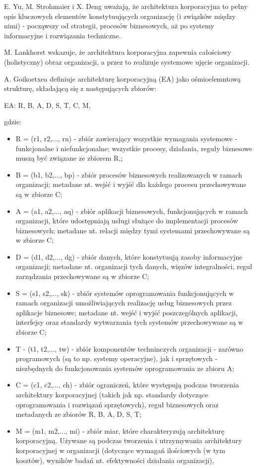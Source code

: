 E. Yu, M. Strohmaier i X. Deng uważają, że architektura korporacyjna to pełny opis kluczowych elementów konstytuujących organizację (i związków między nimi) - począwszy od strategii, procesów biznesowych, aż po systemy informacyjne i rozwiązania techniczne.

M. Lankhorst wskazuje, że architektura korporacyjna zapewnia całościowy (holistyczny) obraz organizacji, a przez to realizuje systemowe ujęcie organizacji. 

A. Goikoetxea definiuje architekturę korporacyjną (EA) jako ośmioelemntową strukturę, składającą się z następujących zbiorów:

\begin{center}
EA: {R, B, A, D, S, T, C, M},
\end{center}

gdzie:
\begin{itemize}
\item{R = (r1, r2,..., rn) - zbiór zawierający wszystkie wymagania systemowe - funkcjonalne i niefunkcjonalne; wszystkie procesy, działania, reguły biznesowe muszą być związane ze zbiorem R,;}
\item{B = (b1, b2,..., bp) - zbiór procesów biznesowych realizowanych w ramach organizacji; metadane nt. wejść i wyjść dla każdego procesu przechowywane są w zbiorze C;}
\item{A = (a1, a2,..., aq) - zbiór aplikacji biznesowych, funkcjonujących w ramach organizacji, które udostępniają usługi służące do implementacji procesów biznesowych; metadane nt. relacji między tymi systemami przechowywane są w zbiorze C;}
\item{D = (d1, d2,..., dg) - zbiór danych, które konstytuują zasoby informacyjne organizacji; metadane nt. organizacji tych danych, więzów integralności, reguł zarządzania przechowywane są w zbiorze C;}
\item{S = (s1, s2,..., sk) - zbiór systemów oprogramowania funkcjonujących w ramach organizacji umożliwiających realizację usług biznesowych przez aplikacje biznesowe; metadane nt. wejść i wyjść poszczególnych aplikacji, interfejsy oraz standardy wytwarzania tych systemów przechowywane są w zbiorze C;}
\item{T - (t1, t2,..., tw) - zbiór komponentów techninczych organizacji - zarówno programowych (są to np. systemy operacyjne), jak i sprzętowych - niezbędnych do funkcjonowania systemów oprogramowania ze zbioru A;}
\item{C = (c1, c2,..., ch) - zbiór ograniczeń, które występują podczas tworzenia architektury korporacyjnej (takich jak np. standardy dotyczące oprogramowania i rozwiązań sprzętowych), reguł biznesowych oraz metadanych ze zbiorów R, B, A, D, S, T;}
\item{M = (m1, m2,..., mi) - zbiór miar, które charakteryzują architekturę korporacyjną. Używane są podczas tworzenia i utrzymywania architektury korporacyjnej w organizacji (dotyczące wymagań ilościowych (w tym kosztów), wyników badań nt. efektywności działania organizacji),}
\end{itemize}

